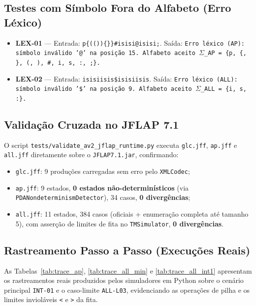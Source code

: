 \subsection{Testes com Símbolo Fora do Alfabeto (Erro Léxico)}
\begin{itemize}
    \item \textbf{LEX-01} --- Entrada: \texttt{p\{(())\{\}\}\#isisi@isisi;}. Saída: \texttt{Erro léxico (AP): símbolo inválido '@' na posição 15. Alfabeto aceito $\Sigma$\_AP = \{p, \{, \}, (, ), \#, i, s, :, ;\}.}
    \item \textbf{LEX-02} --- Entrada: \texttt{isisiisis\$isisiisis}. Saída: \texttt{Erro léxico (ALL): símbolo inválido '\$' na posição 9. Alfabeto aceito $\Sigma$\_ALL = \{i, s, :\}.}
\end{itemize}

\subsection{Validação Cruzada no JFLAP 7.1}
O script \texttt{tests/validate\_av2\_jflap\_runtime.py} executa \texttt{glc.jff}, \texttt{ap.jff} e \texttt{all.jff} diretamente sobre o \texttt{JFLAP7.1.jar}, confirmando:
\begin{itemize}
    \item \texttt{glc.jff}: 9 produções carregadas sem erro pelo \texttt{XMLCodec};
    \item \texttt{ap.jff}: 9 estados, \textbf{0 estados não-determinísticos} (via \texttt{PDANondeterminismDetector}), 34 casos, \textbf{0 divergências};
    \item \texttt{all.jff}: 11 estados, 384 casos (oficiais + enumeração completa até tamanho 5), com asserção de limites de fita no \texttt{TMSimulator}, \textbf{0 divergências}.
\end{itemize}

\subsection{Rastreamento Passo a Passo (Execuções Reais)}
As Tabelas~\ref{tab:trace_ap}, \ref{tab:trace_all_min} e \ref{tab:trace_all_int1} apresentam os rastreamentos reais produzidos pelos simuladores em Python sobre o cenário principal \texttt{INT-01} e o caso-limite \texttt{ALL-L03}, evidenciando as operações de pilha e os limites invioláveis \texttt{<} e \texttt{>} da fita.

